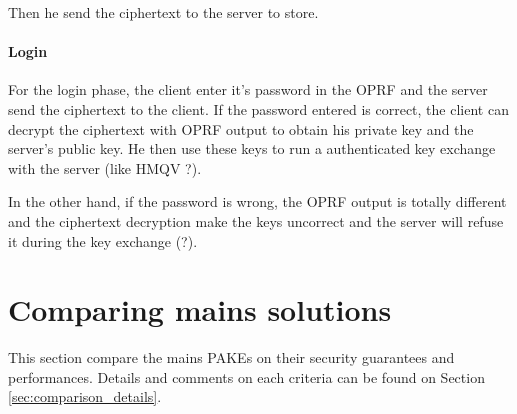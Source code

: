 \documentclass[../report.tex]{subfiles}
\begin{document}
Then he send the ciphertext to the server to store.


\paragraph{Login}
For the login phase, the client enter it's password in the OPRF and the server send the ciphertext to the client.
If the password entered is correct, the client can decrypt the ciphertext with OPRF output to obtain his private key and the server's public key.
He then use these keys to run a authenticated key exchange with the server (like HMQV ?).

In the other hand, if the password is wrong, the OPRF output is totally different and the ciphertext decryption make the keys uncorrect and the server will refuse it during the key exchange (?). %




\section{Comparing mains solutions}

This section compare the mains PAKEs on their security guarantees and performances. Details and comments on each criteria can be found on Section \ref{sec:comparison_details}.
\end{document}
